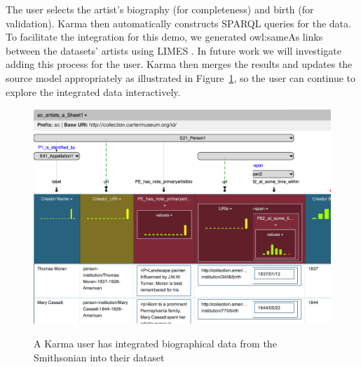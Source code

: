 The user selects the artist's biography (for completeness) and birth (for validation). Karma then automatically constructs SPARQL queries for the data.
To facilitate the integration for this demo, we generated owl:sameAs links between the datasets' artists using LIMES \cite{ngomo2011limes}.  In future work we will investigate adding this process for the user.
Karma then merges the results and updates the source model appropriately as illustrated in Figure~\ref{fig:augment-screenshot}, so the user can continue to explore the integrated data interactively. 

\begin{figure}
\begin{center}
\includegraphics[width=4.9in]{images/6-augment.png}
\vspace{-3mm}
\caption{A Karma user has integrated biographical data from the Smithsonian into their dataset}
\vspace{-2mm}
\label{fig:augment-screenshot}
\end{center}
\vspace{-1.5em}
\end{figure}
